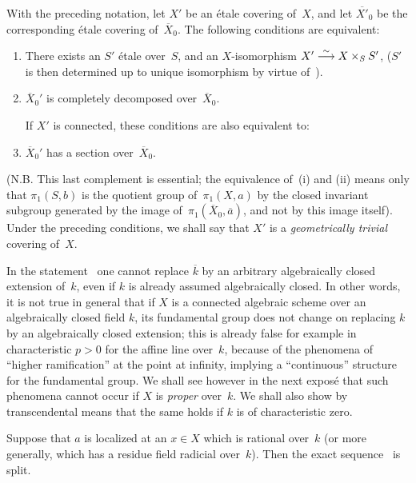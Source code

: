 \begin{corollary}
\label{IX.6.2}
With the preceding notation, let $X'$ be an étale covering of~$X$, and
let $\overline{X'}_0$ be the corresponding étale covering
of~$\overline{X}_0$. The following conditions are equivalent:
\begin{enumerate}
\item[(i)] There exists an $S'$ étale over~$S$, and an $X$-isomorphism
$X'\overset{\sim}{\longrightarrow} X\times_S S'$, ($S'$ is then determined up to unique
isomorphism by virtue of~).
\item[(ii)] $\overline{X}_0'$ is completely decomposed
over~$\overline{X}_0$.

If $X'$ is connected, these conditions are also equivalent to:
\item[(ii~bis)] $\overline{X}_0'$ has a section over~$\overline{X}_0$.
\end{enumerate}
\end{corollary}

(N.B. This last complement is essential; the equivalence of~(i) and
(ii) means only that $\pi_1(S,b)$ is the quotient group
of~$\pi_1(X,a)$ by the closed invariant subgroup
generated by the image of~$\pi_1(\overline{X}_0,\overline{a})$, and
not by this image itself). Under the preceding conditions, we shall
say that $X'$ is a \emph{geometrically trivial} covering of~$X$.

\begin{remark}
\label{IX.6.3}
In the statement~ one cannot replace $\overline{k}$ by an
arbitrary algebraically closed extension of~$k$, even if $k$ is
already assumed algebraically closed. In other words, it is not true
in general that if $X$ is a connected algebraic scheme over an
algebraically closed field $k$, its fundamental group does not change
on replacing $k$ by an algebraically closed extension; this is already
false for example in characteristic $p>0$ for the affine line over~$k$,
because of the phenomena of ``higher ramification'' at the point at
infinity, implying a ``continuous'' structure for the fundamental
group. We shall see however in the next exposé that such phenomena
cannot occur if $X$ is \emph{proper} over~$k$. We shall also show by
transcendental means that the same holds if $k$ is of characteristic
zero.
\end{remark}

\begin{corollary}
\label{IX.6.4}
Suppose that $a$ is localized at an $x\in X$ which is rational
over~$k$ (or more generally, which has a residue field radicial
over~$k$). Then the exact sequence~ is split.
\end{corollary}

